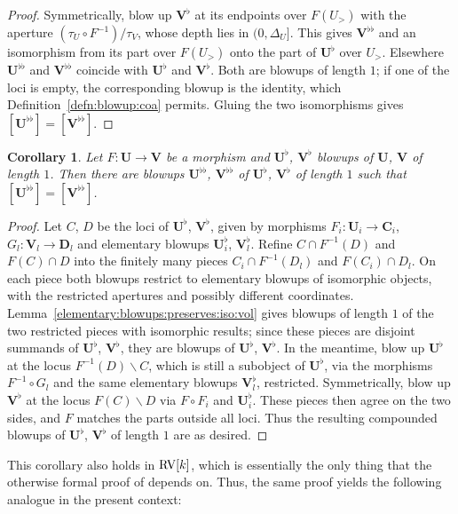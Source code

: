 \documentclass[12pt]{amsart}
\theoremstyle{plain}
\newtheorem{cor}[thm]{Corollary}
\theoremstyle{definition}
\theoremstyle{remark}
\numberwithin{equation}{section}
\theoremstyle{plain}
\newcommand{\RV}{\textup{RV}}
\newcommand{\0}{\emptyset}
\newcommand{\fun}{\longrightarrow}
\newcommand{\mi}{\smallsetminus}
\begin{document}
\begin{proof}
Symmetrically, blow up $\bm V^{\flat}$ at its endpoints over $F(U_{>})$ with the aperture $(\tau_U \circ F^{-1})/\tau_V$, whose depth lies in $(0, \Delta_U]$. This gives $\bm V^{\flat\flat}$ and an isomorphism from its part over $F(U_{>})$ onto the part of $\bm U^{\flat}$ over $U_{>}$. Elsewhere $\bm U^{\flat\flat}$ and $\bm V^{\flat\flat}$ coincide with $\bm U^{\flat}$ and $\bm V^{\flat}$. Both are blowups of length $1$; if one of the loci is empty, the corresponding blowup is the identity, which Definition~\ref{defn:blowup:coa} permits. Gluing the two isomorphisms gives $[\bm U^{\flat\flat}] = [\bm V^{\flat\flat}]$.
\end{proof}

\begin{cor}\label{eblowup:same:loci:iso}
Let $F : \bm U \fun \bm V$ be a morphism and $\bm U^{\flat}$, $\bm V^{\flat}$ blowups of  $\bm U$, $\bm V$ of length $1$. Then there are blowups $\bm U^{\flat\flat}$, $\bm V^{\flat\flat}$ of $\bm U^{\flat}$, $\bm V^{\flat}$ of length $1$ such that $[\bm U^{\flat\flat}] = [\bm V^{\flat\flat}]$.
\end{cor}
\begin{proof}
Let $C$, $D$ be the loci of $\bm U^{\flat}$, $\bm V^{\flat}$, given by morphisms $F_i : \bm U_i \fun \bm C_i$, $G_l : \bm V_l \fun \bm D_l$ and elementary blowups $\bm U_i^{\flat}$, $\bm V_l^{\flat}$. Refine $C \cap F^{-1}(D)$ and $F(C) \cap D$ into the finitely many pieces $C_i \cap F^{-1}(D_l)$ and $F(C_i) \cap D_l$. On each piece both blowups restrict to elementary blowups of isomorphic objects, with the restricted apertures and possibly different coordinates. Lemma~\ref{elementary:blowups:preserves:iso:vol} gives blowups of length $1$ of the two restricted pieces with isomorphic results; since these pieces are disjoint summands of $\bm U^{\flat}$, $\bm V^{\flat}$, they are blowups of $\bm U^{\flat}$, $\bm V^{\flat}$. In the meantime, blow up $\bm U^{\flat}$ at the locus $F^{-1}(D) \mi C$, which is still a subobject of $\bm U^{\flat}$, via the morphisms $F^{-1} \circ G_l$ and the same elementary blowups $\bm V_l^{\flat}$, restricted. Symmetrically, blow up $\bm V^{\flat}$ at the locus $F(C) \mi D$ via $F \circ F_i$ and $\bm U_i^{\flat}$. These pieces then agree on the two sides, and $F$ matches the parts outside all loci. Thus the resulting compounded blowups of $\bm U^{\flat}$, $\bm V^{\flat}$ of length $1$ are as desired.
\end{proof}


This corollary also holds in $\RV[k]$, which is essentially the only thing that the otherwise formal proof of \cite[Lemma~6.5]{Yin:int:acvf} depends on. Thus, the same proof yields the following analogue in the present context:
\end{document}
